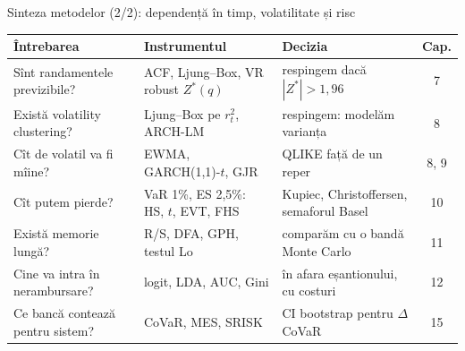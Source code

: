\begin{frame}{Sinteza metodelor (2/2): dependență în timp, volatilitate și risc}
\itemsize{\small}
\begin{center}
\footnotesize
\begin{tabular}{>{\raggedright\arraybackslash}p{3.6cm}>{\raggedright\arraybackslash}p{3.4cm}>{\raggedright\arraybackslash}p{3.4cm}c}
\toprule
\textbf{Întrebarea} & \textbf{Instrumentul} & \textbf{Decizia} & \textbf{Cap.} \\
\midrule
Sînt randamentele previzibile? & ACF, Ljung--Box, VR robust $Z^*(q)$ & respingem dacă $|Z^*| > 1{,}96$ & 7 \\
Există volatility clustering? & Ljung--Box pe $r_t^2$, ARCH-LM & respingem: modelăm varianța & 8 \\
Cît de volatil va fi mîine? & EWMA, GARCH(1,1)-$t$, GJR & QLIKE față de un reper & 8, 9 \\
Cît putem pierde? & VaR 1\%, ES 2,5\%: HS, $t$, EVT, FHS & Kupiec, Christoffersen, semaforul Basel & 10 \\
Există memorie lungă? & R/S, DFA, GPH, testul Lo & comparăm cu o bandă Monte Carlo & 11 \\
Cine va intra în nerambursare? & logit, LDA, AUC, Gini & în afara eșantionului, cu costuri & 12 \\
Ce bancă contează pentru sistem? & CoVaR, MES, SRISK & CI bootstrap pentru $\Delta$CoVaR & 15 \\
\bottomrule
\end{tabular}
\end{center}
\end{frame}

